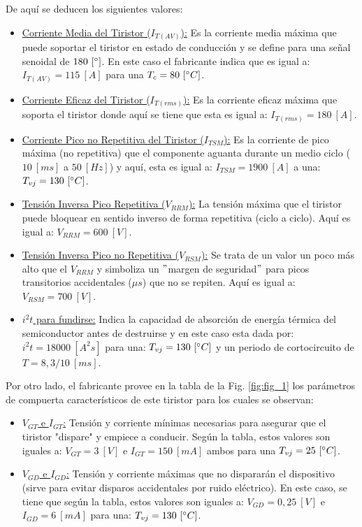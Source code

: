 \documentclass[12pt,a4paper]{article}
\begin{document}
De aquí se deducen los siguientes valores:
\begin{itemize}
    \item \underline{Corriente Media del Tiristor ($I_{T(AV)}$):} Es la corriente media máxima que puede soportar el tiristor en estado de conducción y se define para una señal senoidal de $180 \ [\degree]$. En este caso el fabricante indica que es igual a: $I_{T(AV)} = 115 \ [A]$ para una $T_{c} = 80 \ [\degree C]$.

    \item \underline{Corriente Eficaz del Tiristor ($I_{T(rms)}$):} Es la corriente eficaz máxima que soporta el tiristor donde aquí se tiene que esta es igual a: $I_{T(rms)} = 180 \ [A]$.

    \item \underline{Corriente Pico no Repetitiva del Tiristor ($I_{TSM}$):} Es la corriente de pico máxima (no repetitiva) que el componente aguanta durante un medio ciclo ($10 \ [ms]$ a $50 \ [Hz]$) y aquí, esta es igual a: $I_{TSM} = 1900 \ [A]$ a una: $T_{vj} = 130 \ [\degree C]$.

    \item \underline{Tensión Inversa Pico Repetitiva ($V_{RRM}$):} La tensión máxima que el tiristor puede bloquear en sentido inverso de forma repetitiva (ciclo a ciclo). Aquí es igual a: $V_{RRM} = 600 \ [V]$.

    \item \underline{Tensión Inversa Pico no Repetitiva ($V_{RSM}$):} Se trata de un valor un poco más alto que el $V_{RRM}$ y simboliza un $"$margen de seguridad$"$ para picos transitorios accidentales ($\mu s$) que no se repiten. Aquí es igual a: $V_{RSM} = 700 \ [V]$.

    \item \underline{$i^{2}t$ para fundirse:} Indica la capacidad de absorción de energía térmica del semiconductor antes de destruirse y en este caso esta dada por: $i^{2}t = 18000 \ [A^{2}s]$ para una: $T_{vj} = 130 \ [\degree C]$ y un periodo de cortocircuito de $T = 8,3/10 \ [ms]$. 
\end{itemize}

Por otro lado, el fabricante provee en la tabla de la Fig. \ref{fig:fig_1} los parámetros de compuerta característicos de este tiristor para los cuales se observan:
\begin{itemize}
    \item \underline{$V_{GT}$ e $I_{GT}$:} Tensión y corriente mínimas necesarias para asegurar que el tiristor "dispare" y empiece a conducir. Según la tabla, estos valores son iguales a: $V_{GT} = 3 \ [V]$ e $I_{GT} = 150 \ [mA]$ ambos para una $T_{vj} = 25 \ [\degree C]$.
    
    \item \underline{$V_{GD}$ e $I_{GD}$:} Tensión y corriente máximas que no dispararán el dispositivo (sirve para evitar disparos accidentales por ruido eléctrico). En este caso, se tiene que según la tabla, estos valores son iguales a: $V_{GD} = 0,25 \ [V]$ e $I_{GD} = 6 \ [mA]$ para una: $T_{vj} = 130 \ [\degree C]$.
\end{itemize}
\end{document}

